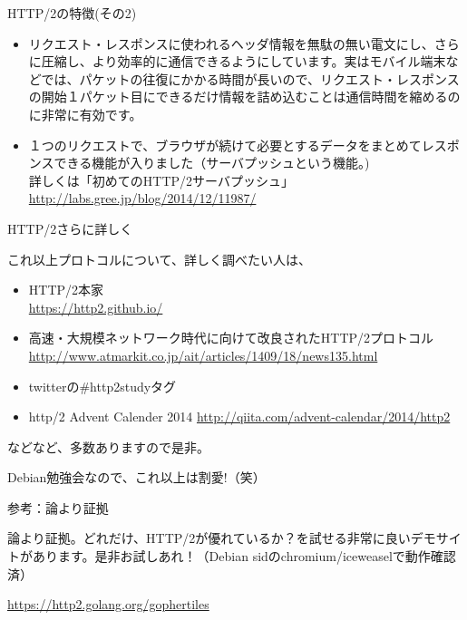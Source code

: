 \begin{frame}{HTTP/2の特徴(その2)}

 \begin{itemize}
\item  リクエスト・レスポンスに使われるヘッダ情報を無駄の無い電文にし、さらに圧縮し、より効率的に通信できるようにしています。実はモバイル端末などでは、パケットの往復にかかる時間が長いので、リクエスト・レスポンスの開始１パケット目にできるだけ情報を詰め込むことは通信時間を縮めるのに非常に有効です。
 \item １つのリクエストで、ブラウザが続けて必要とするデータをまとめてレスポンスできる機能が入りました（サーバプッシュという機能。)\\詳しくは「初めてのHTTP/2サーバプッシュ」\url{http://labs.gree.jp/blog/2014/12/11987/}
\end{itemize}
  
\end{frame}

\begin{frame}{HTTP/2さらに詳しく}

  これ以上プロトコルについて、詳しく調べたい人は、

 \begin{itemize}
  \item HTTP/2本家\\
    \url{https://http2.github.io/}
  \item 高速・大規模ネットワーク時代に向けて改良されたHTTP/2プロトコル
    \url{http://www.atmarkit.co.jp/ait/articles/1409/18/news135.html}
  \item twitterの\#http2studyタグ
  \item http/2 Advent Calender 2014
    \url{http://qiita.com/advent-calendar/2014/http2}
\end{itemize}

 などなど、多数ありますので是非。
 \begin{center}
 {\Large Debian勉強会なので、これ以上は割愛!（笑）}
 \end{center}
\end{frame}
  
\begin{frame}{参考：論より証拠}

  論より証拠。どれだけ、HTTP/2が優れているか？を試せる非常に良いデモサイトがあります。是非お試しあれ！（Debian sidのchromium/iceweaselで動作確認済）
  
  \url{https://http2.golang.org/gophertiles}
  
\end{frame}

